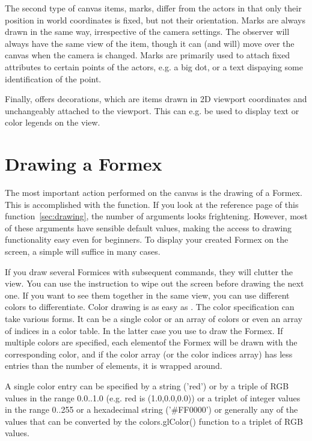 The second type of canvas items, marks, differ from the actors in that only their position in world coordinates is fixed, but not their orientation. Marks are always drawn in the same way, irrespective of the camera settings. The observer will always have the same view of the item, though it can (and will) move over the canvas when the camera is changed. Marks are primarily used to attach fixed attributes to certain points of the actors, e.g. a big dot, or a text dispaying some identification of the point.

Finally, \pyformex offers decorations, which are items drawn in 2D viewport coordinates and unchangeably attached to the viewport. This can e.g. be used to display text or color legends on the view.

   
\section{Drawing a Formex}
The most important action performed on the canvas is the drawing of a Formex.
This is accomplished with the  function. If you look at the reference page of this function~\ref{sec:drawing}, the number of arguments looks frightening. However, most of these arguments have sensible default values, making the access to drawing functionality easy even for beginners. To display your created Formex  on the screen, a simple  will suffice in many cases.

If you draw several Formices with subsequent  commands, they will clutter the view. You can use the  instruction to wipe out the screen before drawing the next one. If you want to see them together in the same view, you can use different colors to differentiate. Color drawing is as easy as . The color specification can take various forms. It can be a single color or an array of colors or even an array of indices in a color table. In the latter case you use  to draw the Formex. If multiple colors are specified, each elementof the Formex will be drawn with the corresponding color, and if the color array (or the color indices array) has less entries than the number of elements, it is wrapped around.

A single color entry can be specified by a string ('red') or by a triple of RGB values in the range 0.0..1.0 (e.g. red is (1.0,0.0,0.0)) or a triplet of integer values in the range 0..255 or a hexadecimal string ('\#FF0000') or generally any of the values that can be converted by the colors.glColor() function to a triplet of RGB values.

